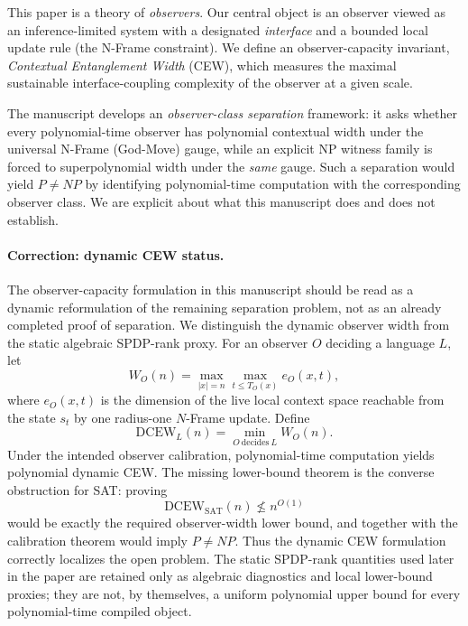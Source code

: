 \documentclass[12pt]{article}
\theoremstyle{definition}
\theoremstyle{definition}
\theoremstyle{remark}
\theoremstyle{remark}
\begin{document}
This paper is a theory of \emph{observers}.  Our central object is an observer viewed as an
inference-limited system with a designated \emph{interface} and a bounded local update
rule (the N-Frame constraint).  We define an observer-capacity invariant,
\emph{Contextual Entanglement Width} (CEW), which measures the maximal sustainable
interface-coupling complexity of the observer at a given scale.

The manuscript develops an \emph{observer-class separation} framework: it asks whether
every polynomial-time observer has polynomial contextual width under the universal
N-Frame (God-Move) gauge, while an explicit NP witness family is forced to
superpolynomial width under the \emph{same} gauge.  Such a separation would yield
$P\neq NP$ by identifying polynomial-time computation with the corresponding observer
class.  We are explicit about what this manuscript does and does not establish.

\paragraph{Correction: dynamic CEW status.}
The observer-capacity formulation in this manuscript should be read as a dynamic reformulation of the remaining separation problem, not as an already completed proof of separation.  We distinguish the dynamic observer width from the static algebraic SPDP-rank proxy.  For an observer \(O\) deciding a language \(L\), let
\[
W_O(n)=\max_{|x|=n}\max_{t\le T_O(x)} e_O(x,t),
\]
where \(e_O(x,t)\) is the dimension of the live local context space reachable from the state \(s_t\) by one radius-one \(N\)-Frame update.  Define
\[
\mathrm{DCEW}_L(n)=\min_{O\ \mathrm{decides}\ L} W_O(n).
\]
Under the intended observer calibration, polynomial-time computation yields polynomial dynamic CEW.  The missing lower-bound theorem is the converse obstruction for SAT: proving
\[
\mathrm{DCEW}_{\mathrm{SAT}}(n)\not\le n^{O(1)}
\]
would be exactly the required observer-width lower bound, and together with the calibration theorem would imply \(P\ne NP\).  Thus the dynamic CEW formulation correctly localizes the open problem.  The static SPDP-rank quantities used later in the paper are retained only as algebraic diagnostics and local lower-bound proxies; they are not, by themselves, a uniform polynomial upper bound for every polynomial-time compiled object.
\end{document}
